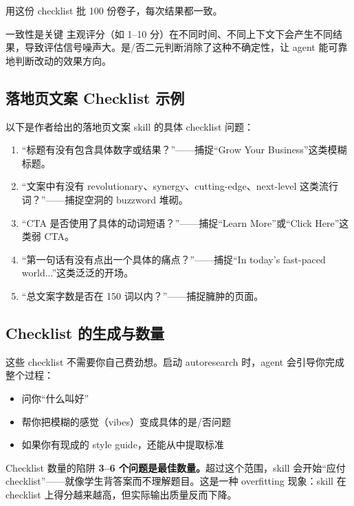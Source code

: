 \documentclass[a4paper]{article}
\begin{document}
用这份 checklist 批 100 份卷子，每次结果都一致。

\begin{knowledgebox}{一致性是关键}
主观评分（如 1--10 分）在不同时间、不同上下文下会产生不同结果，导致评估信号噪声大。是/否二元判断消除了这种不确定性，让 agent 能可靠地判断改动的效果方向。
\end{knowledgebox}

\subsection{落地页文案 Checklist 示例}

以下是作者给出的落地页文案 skill 的具体 checklist 问题：

\begin{enumerate}
    \item ``标题有没有包含具体数字或结果？''——捕捉``Grow Your Business''这类模糊标题。
    \item ``文案中有没有 revolutionary、synergy、cutting-edge、next-level 这类流行词？''——捕捉空洞的 buzzword 堆砌。
    \item ``CTA 是否使用了具体的动词短语？''——捕捉``Learn More''或``Click Here''这类弱 CTA。
    \item ``第一句话有没有点出一个具体的痛点？''——捕捉``In today's fast-paced world...''这类泛泛的开场。
    \item ``总文案字数是否在 150 词以内？''——捕捉臃肿的页面。
\end{enumerate}

\subsection{Checklist 的生成与数量}

这些 checklist 不需要你自己费劲想。启动 autoresearch 时，agent 会引导你完成整个过程：

\begin{itemize}
    \item 问你``什么叫好''
    \item 帮你把模糊的感觉（vibes）变成具体的是/否问题
    \item 如果你有现成的 style guide，还能从中提取标准
\end{itemize}

\begin{warningbox}{Checklist 数量的陷阱}
\textbf{3--6 个问题是最佳数量。}超过这个范围，skill 会开始``应付 checklist''——就像学生背答案而不理解题目。这是一种 overfitting 现象：skill 在 checklist 上得分越来越高，但实际输出质量反而下降。
\end{warningbox}
\end{document}
